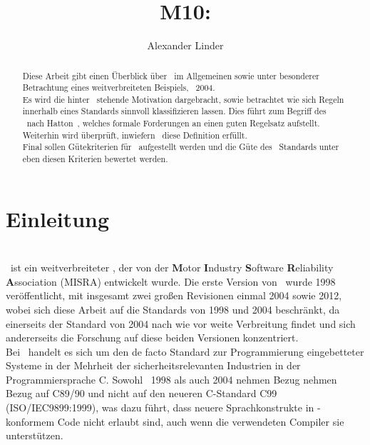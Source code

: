 \documentclass[a4paper,UKenglish,cleveref, autoref]{templates/lipics-v2019}
\title{M10: \sqss}
\author{Alexander Linder}{Karlsruhe Institute of Technology, Germany \and \url{https://kit.edu} }{alexander.linder@student.kit.edu}{}{}
\begin{document}
\maketitle

\begin{abstract}
    Diese Arbeit gibt einen Überblick über \sqss\ im Allgemeinen sowie unter besonderer Betrachtung eines weitverbreiteten Beispiels, \misra\ 2004.\\
    Es wird die hinter \sqss\ stehende Motivation dargebracht, sowie betrachtet wie sich Regeln innerhalb eines Standards sinnvoll klassifizieren lassen.
    Dies führt zum Begriff des \slss\ nach Hatton~\cite{hatton2004safer}, welches formale Forderungen an einen guten Regelsatz aufstellt.
    Weiterhin wird überprüft, inwiefern \misra\ diese Definition erfüllt.\\
    Final sollen Gütekriterien für \sqss\ aufgestellt werden und die Güte des \misra\ Standards unter eben diesen Kriterien bewertet werden.
\end{abstract}

\section{Einleitung}
\label{sec:einleitung}

\section{\misra}
\label{sec:misra-c}
\misra\ ist ein weitverbreiteter \sqs, der von der \textbf{M}otor \textbf{I}ndustry \textbf{S}oftware \textbf{R}eliability \textbf{A}ssociation (MISRA) entwickelt wurde.
Die erste Version von \misra\ wurde 1998 veröffentlicht, mit insgesamt zwei großen Revisionen einmal 2004 sowie 2012,
wobei sich diese Arbeit auf die Standards von 1998 und 2004 beschränkt, da einerseits der Standard von 2004 nach wie vor
weite Verbreitung findet und sich andererseits die Forschung auf diese beiden Versionen konzentriert.\\
Bei \misra\ handelt es sich um den de facto Standard zur Programmierung eingebetteter Systeme in der Mehrheit der sicherheitsrelevanten Industrien in der Programmiersprache C\@.\cite{misra-website}
Sowohl \misra\ 1998 als auch 2004 nehmen Bezug nehmen Bezug auf C89/90 und nicht auf den neueren C-Standard C99 (ISO/IEC9899:1999), was dazu führt, dass neuere Sprachkonstrukte in
\misra-konformem Code nicht erlaubt sind, auch wenn die verwendeten Compiler sie unterstützen.
\end{document}
